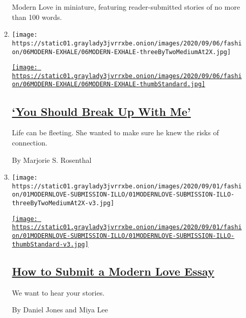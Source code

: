 \begin{enumerate}
\begin{enumerate}
    Modern Love in miniature, featuring reader-submitted stories of no
    more than 100 words.
  \item
    \texttt{[image: https://static01.graylady3jvrrxbe.onion/images/2020/09/06/fashion/06MODERN-EXHALE/06MODERN-EXHALE-threeByTwoMediumAt2X.jpg]}

    \href{/2020/09/04/style/modern-love-widow-cancer-break-up-with-me.html}{\texttt{[image: https://static01.graylady3jvrrxbe.onion/images/2020/09/06/fashion/06MODERN-EXHALE/06MODERN-EXHALE-thumbStandard.jpg]}}

    \hypertarget{you-should-break-up-with-me}{%
    \subsection{\texorpdfstring{\href{/2020/09/04/style/modern-love-widow-cancer-break-up-with-me.html}{`You
    Should Break Up With
    Me'}}{`You Should Break Up With Me'}}\label{you-should-break-up-with-me}}

    Life can be fleeting. She wanted to make sure he knew the risks of
    connection.

    By Marjorie S. Rosenthal
  \item
    \texttt{[image: https://static01.graylady3jvrrxbe.onion/images/2020/09/01/fashion/01MODERNLOVE-SUBMISSION-ILLO/01MODERNLOVE-SUBMISSION-ILLO-threeByTwoMediumAt2X-v3.jpg]}

    \href{/article/how-to-submit-a-modern-love-essay.html}{\texttt{[image: https://static01.graylady3jvrrxbe.onion/images/2020/09/01/fashion/01MODERNLOVE-SUBMISSION-ILLO/01MODERNLOVE-SUBMISSION-ILLO-thumbStandard-v3.jpg]}}

    \hypertarget{how-to-submit-a-modern-love-essay}{%
    \subsection{\texorpdfstring{\href{/article/how-to-submit-a-modern-love-essay.html}{How
    to Submit a Modern Love
    Essay}}{How to Submit a Modern Love Essay}}\label{how-to-submit-a-modern-love-essay}}

    We want to hear your stories.

    By Daniel Jones and Miya Lee
  \end{enumerate}
\end{enumerate}

